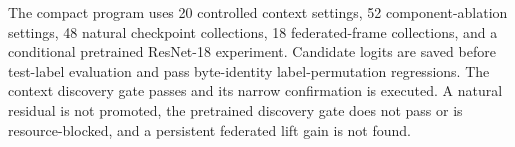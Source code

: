 The compact program uses 20 controlled context settings, 52 component-ablation settings, 48 natural checkpoint collections, 18 federated-frame collections, and a conditional pretrained ResNet-18 experiment. Candidate logits are saved before test-label evaluation and pass byte-identity label-permutation regressions. The context discovery gate passes and its narrow confirmation is executed. A natural residual is not promoted, the pretrained discovery gate does not pass or is resource-blocked, and a persistent federated lift gain is not found.
